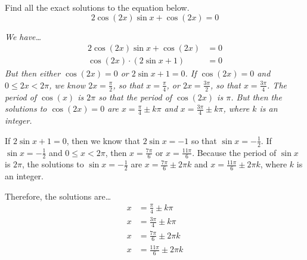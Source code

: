 \documentclass[12pt,letterpaper]{exam}
\begin{document}
\begin{questions}
\newpage
\question[10] Find all the exact solutions to the equation below.
	\[
	2 \cos(2x) \sin x + \cos(2x)= 0 
	\] \pspace

{\itshape \sol We have\dots
	\[
	\begin{aligned}
	2 \cos(2x) \sin x + \cos(2x)&= 0 \\[0.3cm]
	\cos(2x) \cdot (2 \sin x + 1)&= 0 
	\end{aligned}
	\] \pspace
But then either $\cos(2x)= 0$ or $2 \sin x + 1= 0$. If $\cos(2x)= 0$ and $0 \leq 2x < 2\pi$, we know $2x= \frac{\pi}{2}$, so that $x= \frac{\pi}{4}$, or $2x= \frac{3\pi}{2}$, so that $x= \frac{3\pi}{4}$. The period of $\cos(x)$ is $2\pi$ so that the period of $\cos(2x)$ is $\pi$. But then the solutions to $\cos(2x)= 0$ are $x= \frac{\pi}{4} \pm k\pi$ and $x= \frac{3\pi}{4} \pm k\pi$, where $k$ is an integer. \pspace

If $2\sin x + 1= 0$, then we know that $2\sin x= -1$ so that $\sin x= -\frac{1}{2}$. If $\sin x= -\frac{1}{2}$ and $0 \leq x < 2\pi$, then $x= \frac{7\pi}{6}$ or $x= \frac{11\pi}{6}$. Because the period of $\sin x$ is $2\pi$, the solutions to $\sin x= -\frac{1}{2}$ are $x= \frac{7\pi}{6} \pm 2\pi k$ and $x= \frac{11\pi}{6} \pm 2\pi k$, where $k$ is an integer. \pspace

Therefore, the solutions are\dots
	\[
	\begin{aligned}
	x&= \frac{\pi}{4} \pm k\pi \\[0.3cm]
	x&= \frac{3\pi}{4} \pm k\pi \\[0.3cm]
	x&= \frac{7\pi}{6} \pm 2\pi k \\[0.3cm]
	x&= \frac{11\pi}{6} \pm 2\pi k
	\end{aligned} 
	\]
}





























\end{questions}
\end{document}
